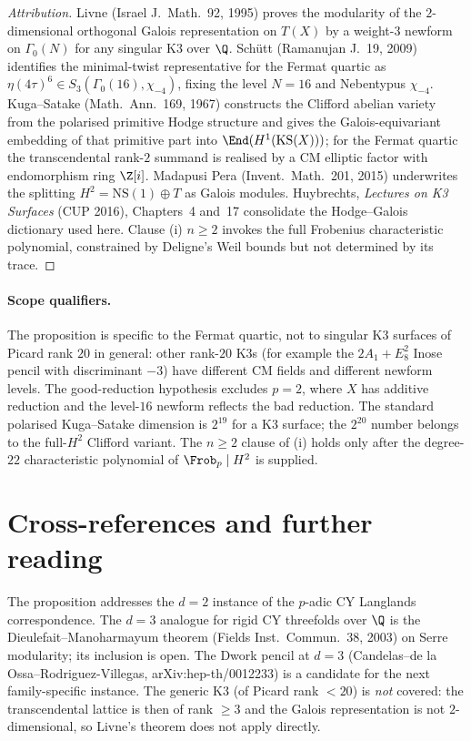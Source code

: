 \begin{proof}[Attribution]
Livne (Israel J.~Math.\ 92, 1995) proves the modularity of the $2$-dimensional orthogonal Galois representation on $T(X)$ by a weight-$3$ newform on $\Gamma_0(N)$ for any singular K3 over $\Q$. Sch\"utt (Ramanujan J.\ 19, 2009) identifies the minimal-twist representative for the Fermat quartic as $\eta(4\tau)^6 \in S_3(\Gamma_0(16), \chi_{-4})$, fixing the level $N = 16$ and Nebentypus $\chi_{-4}$. Kuga--Satake (Math.\ Ann.\ 169, 1967) constructs the Clifford abelian variety from the polarised primitive Hodge structure and gives the Galois-equivariant embedding of that primitive part into $\End(H^1(\mathrm{KS}(X)))$; for the Fermat quartic the transcendental rank-$2$ summand is realised by a CM elliptic factor with endomorphism ring $\Z[i]$. Madapusi Pera (Invent.\ Math.\ 201, 2015) underwrites the splitting $H^2 = \mathrm{NS}(1) \oplus T$ as Galois modules. Huybrechts, \emph{Lectures on K3 Surfaces} (CUP 2016), Chapters~4 and~17 consolidate the Hodge--Galois dictionary used here. Clause (i) $n \geq 2$ invokes the full Frobenius characteristic polynomial, constrained by Deligne's Weil bounds but not determined by its trace.
\end{proof}

\paragraph{Scope qualifiers.}
The proposition is specific to the Fermat quartic, not to singular K3 surfaces of Picard rank $20$ in general: other rank-$20$ K3s (for example the $2A_1 + E_8^2$ Inose pencil with discriminant $-3$) have different CM fields and different newform levels. The good-reduction hypothesis excludes $p = 2$, where $X$ has additive reduction and the level-$16$ newform reflects the bad reduction. The standard polarised Kuga--Satake dimension is $2^{19}$ for a K3 surface; the $2^{20}$ number belongs to the full-$H^2$ Clifford variant. The $n \geq 2$ clause of (i) holds only after the degree-$22$ characteristic polynomial of $\Frob_p \mid H^2$ is supplied.


\section{Cross-references and further reading}
\label{sec:padic-fermat-further}

The proposition addresses the $d = 2$ instance of the $p$-adic CY Langlands correspondence. The $d = 3$ analogue for rigid CY threefolds over $\Q$ is the Dieulefait--Manoharmayum theorem (Fields Inst.\ Commun.\ 38, 2003) on Serre modularity; its inclusion is open. The Dwork pencil at $d = 3$ (Candelas--de la Ossa--Rodriguez-Villegas, arXiv:hep-th/0012233) is a candidate for the next family-specific instance. The generic K3 (of Picard rank $< 20$) is \emph{not} covered: the transcendental lattice is then of rank $\geq 3$ and the Galois representation is not $2$-dimensional, so Livne's theorem does not apply directly.

